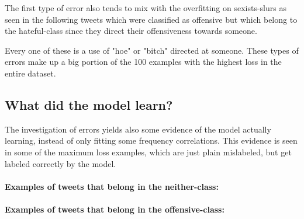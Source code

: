 \documentclass[11pt,a4paper]{article}
\begin{document}
The first type of error also tends to mix with the overfitting on sexists-slurs as seen in the following tweets which were classified as offensive
but which belong to the hateful-class since they direct their offensiveness towards someone.
\begin{center}
  \newline
  \newline
  \newline
\end{center}

Every one of these is a use of "hoe" or "bitch" directed at someone.
These types of errors make up a big portion of the 100 examples with the highest loss in the entire dataset.

\subsection{What did the model learn?}
The investigation of errors yields also some evidence of the model actually learning, instead of only fitting some
frequency correlations. 
This evidence is seen in some of the maximum loss examples, which are just plain mislabeled, but get labeled correctly by the model.

\paragraph{Examples of tweets that belong in the neither-class:}
\begin{center}
\newline
{}\newline
{}\newline
{}\newline
{}\newline
\end{center}

\paragraph{Examples of tweets that belong in the offensive-class:}
\begin{center}
\newline
{}\newline
\end{center}
\end{document}
